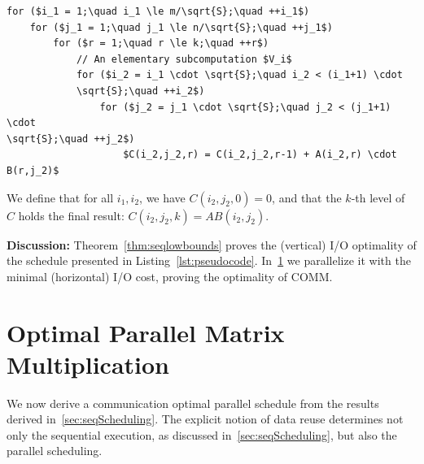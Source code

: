 \documentclass[sigplan,review,anonymous,10pt]{acmart}\settopmatter{printfolios=true,printccs=false,printacmref=false}
\newcommand\greg[1]{\textcolor{blue}{[Greg: #1]}}
\newcommand\mac[1]{\textcolor{red}{[Mac: #1]}}
\newcommand{\macb}[1]{\textbf{\textsf{#1}}}
\begin{document}

\begin{lstlisting}[float=h, caption={Pseudocode of the I/O optimal sequential 
MMM in
the Single 
Static Assignment (SSA) form.},label=lst:pseudocode]
for ($i_1 = 1;\quad i_1 \le m/\sqrt{S};\quad ++i_1$) 
	for ($j_1 = 1;\quad j_1 \le n/\sqrt{S};\quad ++j_1$)
		for ($r = 1;\quad r \le k;\quad ++r$) 
			// An elementary subcomputation $V_i$
			for ($i_2 = i_1 \cdot \sqrt{S};\quad i_2 < (i_1+1) \cdot  
			\sqrt{S};\quad ++i_2$)
				for ($j_2 = j_1 \cdot \sqrt{S};\quad j_2 < (j_1+1) \cdot 
\sqrt{S};\quad ++j_2$)
					$C(i_2,j_2,r) = C(i_2,j_2,r-1) + A(i_2,r) \cdot B(r,j_2)$
\end{lstlisting}
\noindent
We define that for all $i_1,i_2$, we have $C(i_2,j_2,0) = 0$, and that the 
$k$-th level 
of $C$ holds the final result:  $C(i_2, j_2, k) = AB(i_2,j_2)$.


\macb{Discussion:} Theorem~\ref{thm:seqlowbounds} proves the (vertical) I/O 
optimality of 
the schedule presented in Listing~\ref{lst:pseudocode}. 
In~\cref{sec:parOptimality} we parallelize it with the minimal (horizontal) I/O 
cost, proving the optimality of COMM.
%
%
%

\section{Optimal Parallel Matrix Multiplication}
\label{sec:parOptimality}

We now derive a communication optimal parallel schedule from the results
derived in~\cref{sec:seqScheduling}. The explicit notion of data reuse
determines not only the sequential execution, as discussed
in~\cref{sec:seqScheduling}, but also the parallel 
scheduling.
\end{document}
